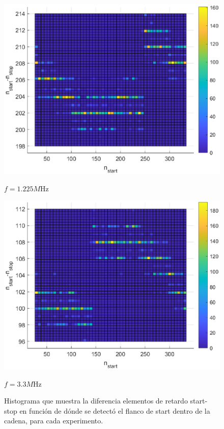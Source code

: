 \begin{figure}[H]
     \vspace{0.5cm} %
     
     \begin{minipage}{0.45\textwidth}
         \centering
         \includegraphics[width=\textwidth]{imagenes/start-stop_1225M.eps} %
         \caption{$f = 1.225M$Hz}
     \end{minipage}\hfill
     \begin{minipage}{0.45\textwidth}
         \centering
         \includegraphics[width=\textwidth]{imagenes/start-stop_3M3.eps} %
         \caption{$f = 3.3M$Hz}
     \end{minipage}
     \caption{Histograma que muestra la diferencia elementos de retardo start-stop en función
          de dónde se detectó el flanco de start dentro de la cadena, para cada experimento.}
\end{figure}

